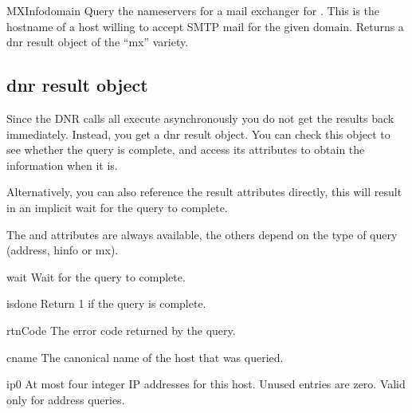 \begin{funcdesc}{MXInfo}{domain}
Query the nameservers for a mail exchanger for .  This is
the hostname of a host willing to accept SMTP mail for the given
domain.  Returns a dnr result object of the ``mx'' variety.
\end{funcdesc}

\subsection{dnr result object}

Since the DNR calls all execute asynchronously you do not get the
results back immediately.  Instead, you get a dnr result object.  You
can check this object to see whether the query is complete, and access
its attributes to obtain the information when it is.

Alternatively, you can also reference the result attributes directly,
this will result in an implicit wait for the query to complete.

The  and  attributes are always available, the
others depend on the type of query (address, hinfo or mx).


\begin{funcdesc}{wait}{}
Wait for the query to complete.
\end{funcdesc}

\begin{funcdesc}{isdone}{}
Return 1 if the query is complete.
\end{funcdesc}


\begin{datadesc}{rtnCode}
The error code returned by the query.
\end{datadesc}

\begin{datadesc}{cname}
The canonical name of the host that was queried.
\end{datadesc}

\begin{datadesc}{ip0}
At most four integer IP addresses for this host.  Unused entries are
zero.  Valid only for address queries.
\end{datadesc}

